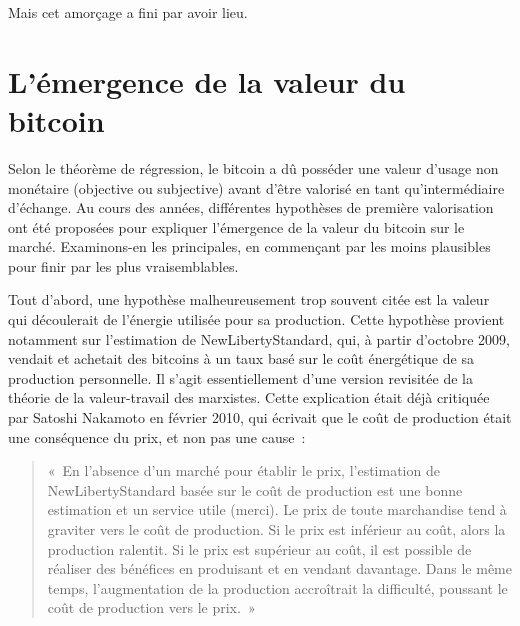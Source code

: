 Mais cet amorçage a fini par avoir lieu.

\section*{L'émergence de la valeur du bitcoin}

Selon le théorème de régression, le bitcoin a dû posséder une valeur d'usage non monétaire (objective ou subjective) avant d'être valorisé en tant qu'intermédiaire d'échange. Au cours des années, différentes hypothèses de première valorisation ont été proposées pour expliquer l'émergence de la valeur du bitcoin sur le marché. Examinons-en les principales, en commençant par les moins plausibles pour finir par les plus vraisemblables.


Tout d'abord, une hypothèse malheureusement trop souvent citée est la valeur qui découlerait de l'énergie utilisée pour sa production. Cette hypothèse provient notamment sur l'estimation de NewLibertyStandard, qui, à partir d'octobre 2009, vendait et achetait des bitcoins à un taux basé sur le coût énergétique de sa production personnelle. Il s'agit essentiellement d'une version revisitée de la théorie de la valeur-travail des marxistes. Cette explication était déjà critiquée par Satoshi Nakamoto en février 2010, qui écrivait que le coût de production était une conséquence du prix, et non pas une cause~:

\begin{quote}
«~En l'absence d'un marché pour établir le prix, l'estimation de NewLibertyStandard basée sur le coût de production est une bonne estimation et un service utile (merci). Le prix de toute marchandise tend à graviter vers le coût de production. Si le prix est inférieur au coût, alors la production ralentit. Si le prix est supérieur au coût, il est possible de réaliser des bénéfices en produisant et en vendant davantage. Dans le même temps, l'augmentation de la production accroîtrait la difficulté, poussant le coût de production vers le prix.~»
\end{quote}

